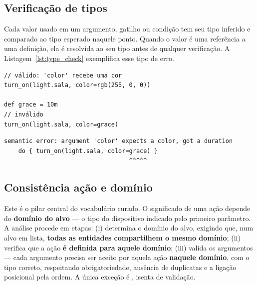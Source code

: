 \documentclass[12pt]{article}
\renewcommand\texttt[1]{\svtt{\small#1}}
\begin{document}
\subsection{Verificação de tipos}

Cada valor usado em um argumento, gatilho ou condição tem seu tipo
inferido e comparado ao tipo esperado naquele ponto. Quando o
valor é uma referência a uma definição, ela é resolvida ao seu
tipo antes de qualquer verificação. A Listagem~\ref{lst:type_check}
exemplifica esse tipo de erro. 





\begin{listing}[H]
    \centering
    \begin{verbatim}
// válido: 'color' recebe uma cor
turn_on(light.sala, color=rgb(255, 0, 0))   

def grace = 10m
// inválido
turn_on(light.sala, color=grace)            
    \end{verbatim}
    \begin{verbatim}
semantic error: argument 'color' expects a color, got a duration
    do { turn_on(light.sala, color=grace) }
                                   ^^^^^
    \end{verbatim}
    \caption{Verificação de tipo.}
    \label{lst:type_check}
\end{listing}

\subsection{Consistência ação e domínio}

Este é o pilar central do vocabulário curado. O significado de uma ação
depende do \textbf{domínio do alvo} --- o tipo do dispositivo indicado
pelo primeiro parâmetro. A análise procede em etapas: (i) determina o
domínio do alvo, exigindo que, num alvo em lista, \textbf{todas as
entidades compartilhem o mesmo domínio}; (ii) verifica que a ação
\textbf{é definida para aquele domínio}; (iii) valida os argumentos ---
cada argumento precisa ser aceito por aquela ação \textbf{naquele
domínio}, com o tipo correto, respeitando obrigatoriedade, ausência de
duplicatas e a ligação posicional pela ordem. A única exceção é
\texttt{call(...)}, isenta de validação.
\end{document}
